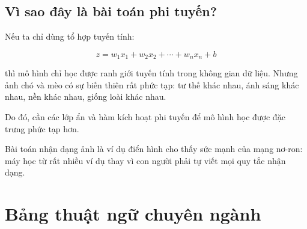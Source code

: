 \documentclass[12pt,a4paper]{report}
\begin{document}
\section{Vì sao đây là bài toán phi tuyến?}

Nếu ta chỉ dùng tổ hợp tuyến tính:

\[
    z = w_1x_1 + w_2x_2 + \cdots + w_nx_n + b
\]

thì mô hình chỉ học được ranh giới tuyến tính trong không gian dữ liệu. Nhưng ảnh chó và mèo có sự biến thiên rất phức tạp: tư thế khác nhau, ánh sáng khác nhau, nền khác nhau, giống loài khác nhau.

Do đó, cần các lớp ẩn và hàm kích hoạt phi tuyến để mô hình học được đặc trưng phức tạp hơn.

\begin{ghinho}
Bài toán nhận dạng ảnh là ví dụ điển hình cho thấy sức mạnh của mạng nơ-ron: máy học từ rất nhiều ví dụ thay vì con người phải tự viết mọi quy tắc nhận dạng.
\end{ghinho}

\chapter{Bảng thuật ngữ chuyên ngành}
\end{document}
